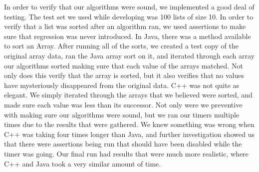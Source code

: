 
In order to verify that our algorithms were sound, we implemented a good deal of testing. The test set we used while developing was 100 lists of size 10. In order to
verify that a list was sorted after an algorithm ran, we used assertions to make sure that regression was never introduced. In Java, there was a method available
to sort an Array. After running all of the sorts, we created a test copy of the original array data, ran the Java array sort on it, and iterated through each
array our algorithms sorted making sure that each value of the arrays matched. Not only does this verify that the array is sorted, but it also verifies that no values
have mysteriously disappeared from the original data. C++ was not quite as elegant. We simply iterated through the arrays that we believed were sorted, and made sure
each value was less than its successor. Not only were we preventive with making sure our algorithms were sound, but we ran our timers multiple times due to the results
that were gathered. We knew something was wrong when C++ was taking four times longer than Java, and further investigation showed us that there were assertions being run
that should have been disabled while the timer was going. Our final run had results that were much more realistic, where C++ and Java took a very similar amount of time.
